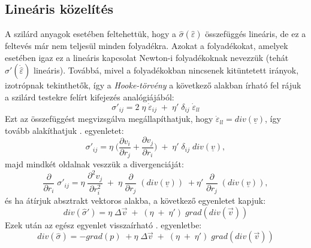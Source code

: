 \documentclass[a4paper, titlepage]{article}
\begin{document}
\subsection*{Lineáris közelítés}
A szilárd anyagok esetében feltehettük, hogy a $\hat{\sigma}(\hat{\varepsilon})$ összefüggés lineáris, de ez a feltevés már nem teljesül minden folyadékra. Azokat a folyadékokat, amelyek esetében igaz ez a lineáris kapcsolat Newton-i folyadékoknak nevezzük (tehát $\hat{\sigma}'(\dot{\hat{\varepsilon}})$ lineáris). Továbbá, mivel a folyadékokban nincsenek kitüntetett irányok, izotrópnak tekinthetők, így a \textit{Hooke-törvény} a következő alakban írható fel rájuk a szilárd testekre felírt kifejezés analógiájából:
\begin{equation}
\label{equ:Hooke}
\sigma'_{ij}=2\; \eta\; \dot{\varepsilon}_{ij}\;+\; \eta'\; \delta_{ij}\; \dot{\varepsilon}_{ll}
\end{equation}
Ezt az összefüggést megvizsgálva megállapíthatjuk, hogy $\dot{\varepsilon}_{ll}=div(\underline{v})$, így tovább alakíthatjuk . egyenletet:
\begin{equation}
\sigma'_{ij}=\eta\;\bigg(\frac{\partial v_i}{\partial r_j}+\frac{\partial v_j}{\partial r_i}\bigg)\; +\; \eta'\;\delta_{ij}\; div(\underline{v}),
\end{equation}
majd mindkét oldalnak veszzük a divergenciáját:
\begin{equation}
\frac{\partial}{\partial r_i}\; \sigma'_{ij}=\eta\; \frac{\partial^2 v_j}{\partial r_i^2}\;+\;\eta\;\frac{\partial}{\partial r_j}\;(div(\underline{v}))\;+\eta'\;\frac{\partial}{\partial r_j}\; (div(\underline{v})),
\end{equation}
és ha átírjuk absztrakt vektoros alakba, a következő egyenletet kapjuk:
\begin{equation}div(\hat{\sigma}')=\eta\;\Delta\vec{v}\; +\; (\eta\; +\; \eta')\;grad(div(\vec{v}))
\end{equation}
Ezek után az egész egyenlet visszaírható . egyenletbe:
\begin{equation}
\label{equ:divsigma}
div(\hat{\sigma})=-grad(p)\;+\eta\;\Delta\vec{v}\; +\; (\eta\; +\; \eta')\;grad(div(\vec{v}))
\end{equation}
\end{document}
